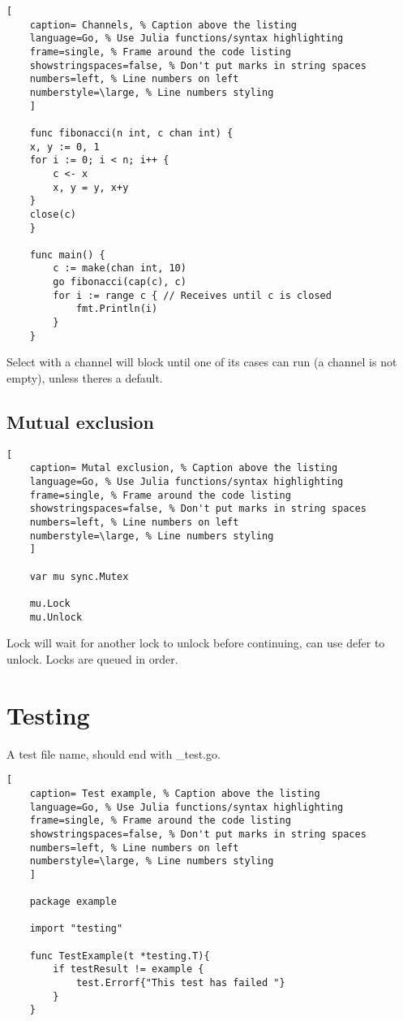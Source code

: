\documentclass[11pt]{scrartcl} %
\begin{document}
\begin{lstlisting}[
	caption= Channels, % Caption above the listing
	language=Go, % Use Julia functions/syntax highlighting
	frame=single, % Frame around the code listing
	showstringspaces=false, % Don't put marks in string spaces
	numbers=left, % Line numbers on left
	numberstyle=\large, % Line numbers styling
	]

	func fibonacci(n int, c chan int) {
	x, y := 0, 1
	for i := 0; i < n; i++ {
		c <- x
		x, y = y, x+y
	}
	close(c)
	}

	func main() {
		c := make(chan int, 10)
		go fibonacci(cap(c), c)
		for i := range c { // Receives until c is closed
			fmt.Println(i)
		}
	}

\end{lstlisting}

Select with a channel will block until one of its cases can run (a channel is not empty), 
unless theres a default.

\subsection{Mutual exclusion}

\begin{lstlisting}[
	caption= Mutal exclusion, % Caption above the listing
	language=Go, % Use Julia functions/syntax highlighting
	frame=single, % Frame around the code listing
	showstringspaces=false, % Don't put marks in string spaces
	numbers=left, % Line numbers on left
	numberstyle=\large, % Line numbers styling
	]

	var mu sync.Mutex

	mu.Lock
	mu.Unlock 

\end{lstlisting}

Lock will wait for another lock to unlock before continuing, can use defer to unlock. Locks are queued
in order.

\section{Testing}

A test file name, should end with \_test.go.

\begin{lstlisting}[
	caption= Test example, % Caption above the listing
	language=Go, % Use Julia functions/syntax highlighting
	frame=single, % Frame around the code listing
	showstringspaces=false, % Don't put marks in string spaces
	numbers=left, % Line numbers on left
	numberstyle=\large, % Line numbers styling
	]

	package example

	import "testing"

	func TestExample(t *testing.T){
		if testResult != example {
			test.Errorf{"This test has failed "}
		}
	}

\end{lstlisting}
\end{document}
